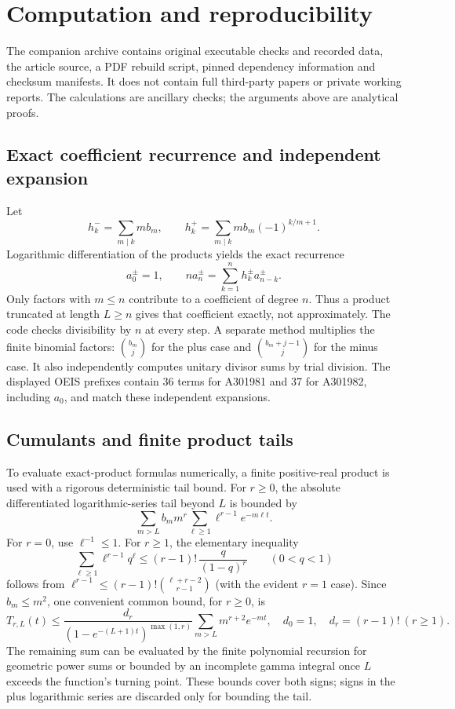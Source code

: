 \documentclass[11pt]{article}
\theoremstyle{remark}\newtheorem{remark}[theorem]{Remark}
\numberwithin{equation}{section}
\begin{document}
\section{Computation and reproducibility}\label{udp:sec:computation}
The companion archive contains original executable checks and recorded data, the article source, a PDF rebuild script, pinned dependency information and checksum manifests. It does not contain full third-party papers or private working reports. The calculations are ancillary checks; the arguments above are analytical proofs.

\subsection{Exact coefficient recurrence and independent expansion}
Let
\[
 h_k^-=\sum_{m\mid k}m b_m,\qquad
 h_k^+=\sum_{m\mid k}m b_m(-1)^{k/m+1}.
\]
Logarithmic differentiation of the products yields the exact recurrence
\begin{equation}\label{udp:eq:recurrence}
 a_0^\pm=1,\qquad
 n a_n^\pm=\sum_{k=1}^n h_k^\pm a_{n-k}^\pm.
\end{equation}
Only factors with $m\le n$ contribute to a coefficient of degree $n$. Thus a product truncated at length $L\ge n$ gives that coefficient exactly, not approximately. The code checks divisibility by $n$ at every step. A separate method multiplies the finite binomial factors: $\binom{b_m}{j}$ for the plus case and $\binom{b_m+j-1}{j}$ for the minus case. It also independently computes unitary divisor sums by trial division. The displayed OEIS prefixes contain 36 terms for A301981 and 37 for A301982, including $a_0$, and match these independent expansions.

\subsection{Cumulants and finite product tails}
To evaluate exact-product formulas numerically, a finite positive-real product is used with a rigorous deterministic tail bound. For $r\ge0$, the absolute differentiated logarithmic-series tail beyond $L$ is bounded by
\begin{equation}\label{udp:eq:tailraw}
 \sum_{m>L}b_m m^r\sum_{\ell\ge1}\ell^{r-1}e^{-m\ell t}.
\end{equation}
For $r=0$, use $\ell^{-1}\le1$. For $r\ge1$, the elementary inequality
\[
 \sum_{\ell\ge1}\ell^{r-1}q^\ell
 \le (r-1)!\,\frac{q}{(1-q)^r}\qquad(0<q<1)
\]
follows from $\ell^{r-1}\le(r-1)!\binom{\ell+r-2}{r-1}$ (with the evident $r=1$ case). Since $b_m\le m^2$, one convenient common bound, for $r\ge0$, is
\begin{equation}\label{udp:eq:tailbound}
 T_{r,L}(t)\le
 \frac{d_r}{(1-e^{-(L+1)t})^{\max(1,r)}}
 \sum_{m>L}m^{r+2}e^{-mt},\quad
 d_0=1,\quad d_r=(r-1)!\ (r\ge1).
\end{equation}
The remaining sum can be evaluated by the finite polynomial recursion for geometric power sums or bounded by an incomplete gamma integral once $L$ exceeds the function's turning point. These bounds cover both signs; signs in the plus logarithmic series are discarded only for bounding the tail.
\end{document}
